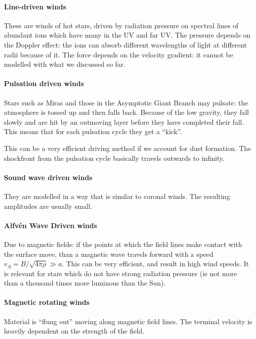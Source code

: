 \documentclass[main.tex]{subfiles}
\begin{document}
\paragraph{Line-driven winds}
These are winds of hot stars, driven by radiation pressure on spectral lines of abundant ions which have many in the UV and far UV.
The pressure depends on the Doppler effect: the ions can absorb different wavelengths of light at different radii because of it.
The force depends on the velocity gradient: it cannot be modelled with what we discussed so far.

\paragraph{Pulsation driven winds}
Stars such as Miras and those in the Asymptotic Giant Branch may pulsate: the atmosphere is tossed up and then falls back. Because of the low gravity, they fall slowly and are hit by an outmoving layer before they have completed their fall. 
This means that for each pulsation cycle they get a ``kick''.  

This can be a very efficient driving method if we account for dust formation. The shockfront from the pulsation cycle basically travels outwards to infinity.

\paragraph{Sound wave driven winds}
They are modelled in a way that is similar to coronal winds. 
The resulting amplitudes are usually small. 

\paragraph{Alfvén Wave Driven winds}
Due to magnetic fields: if the points at which the field lines make contact with the surface move, than a magnetic wave travels forward with a speed \(v_A = B / \sqrt{4 \pi \rho } \gg a\). 
This can be very efficient, and result in high wind speeds. 
It is relevant for stars which do not have strong radiation pressure (ie not more than a thousand times more luminous than the Sun). 

\paragraph{Magnetic rotating winds}
Material is ``flung out'' moving along magnetic field lines. 
The terminal velocity is heavily dependent on the strength of the field.
\end{document}
